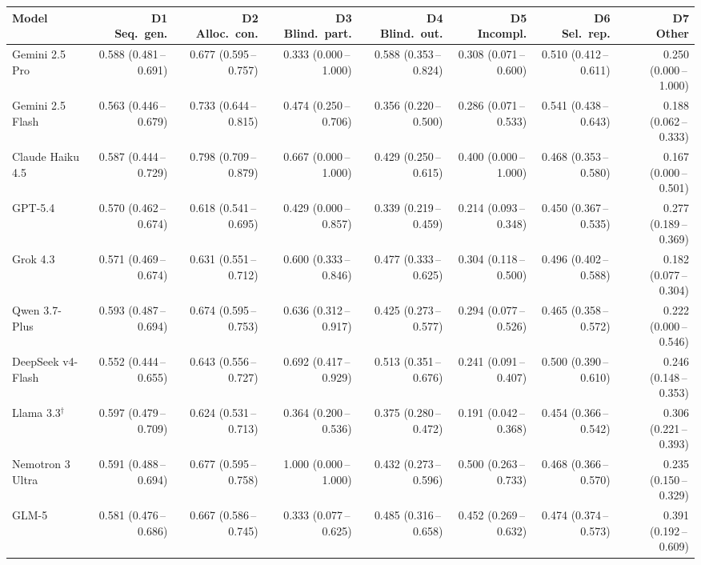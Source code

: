 \begin{tabular}{lrrrrrrr}
\toprule
Model & \makecell{D1\\Seq.\ gen.} & \makecell{D2\\Alloc.\ con.} & \makecell{D3\\Blind.\ part.} & \makecell{D4\\Blind.\ out.} & \makecell{D5\\Incompl.} & \makecell{D6\\Sel.\ rep.} & \makecell{D7\\Other} \\
\midrule
Gemini 2.5 Pro & 0.588 (0.481\,--\,0.691) & 0.677 (0.595\,--\,0.757) & 0.333 (0.000\,--\,1.000) & 0.588 (0.353\,--\,0.824) & 0.308 (0.071\,--\,0.600) & 0.510 (0.412\,--\,0.611) & 0.250 (0.000\,--\,1.000) \\
Gemini 2.5 Flash & 0.563 (0.446\,--\,0.679) & 0.733 (0.644\,--\,0.815) & 0.474 (0.250\,--\,0.706) & 0.356 (0.220\,--\,0.500) & 0.286 (0.071\,--\,0.533) & 0.541 (0.438\,--\,0.643) & 0.188 (0.062\,--\,0.333) \\
Claude Haiku 4.5 & 0.587 (0.444\,--\,0.729) & 0.798 (0.709\,--\,0.879) & 0.667 (0.000\,--\,1.000) & 0.429 (0.250\,--\,0.615) & 0.400 (0.000\,--\,1.000) & 0.468 (0.353\,--\,0.580) & 0.167 (0.000\,--\,0.501) \\
GPT-5.4 & 0.570 (0.462\,--\,0.674) & 0.618 (0.541\,--\,0.695) & 0.429 (0.000\,--\,0.857) & 0.339 (0.219\,--\,0.459) & 0.214 (0.093\,--\,0.348) & 0.450 (0.367\,--\,0.535) & 0.277 (0.189\,--\,0.369) \\
Grok 4.3 & 0.571 (0.469\,--\,0.674) & 0.631 (0.551\,--\,0.712) & 0.600 (0.333\,--\,0.846) & 0.477 (0.333\,--\,0.625) & 0.304 (0.118\,--\,0.500) & 0.496 (0.402\,--\,0.588) & 0.182 (0.077\,--\,0.304) \\
Qwen 3.7-Plus & 0.593 (0.487\,--\,0.694) & 0.674 (0.595\,--\,0.753) & 0.636 (0.312\,--\,0.917) & 0.425 (0.273\,--\,0.577) & 0.294 (0.077\,--\,0.526) & 0.465 (0.358\,--\,0.572) & 0.222 (0.000\,--\,0.546) \\
DeepSeek v4-Flash & 0.552 (0.444\,--\,0.655) & 0.643 (0.556\,--\,0.727) & 0.692 (0.417\,--\,0.929) & 0.513 (0.351\,--\,0.676) & 0.241 (0.091\,--\,0.407) & 0.500 (0.390\,--\,0.610) & 0.246 (0.148\,--\,0.353) \\
Llama 3.3$^\dagger$ & 0.597 (0.479\,--\,0.709) & 0.624 (0.531\,--\,0.713) & 0.364 (0.200\,--\,0.536) & 0.375 (0.280\,--\,0.472) & 0.191 (0.042\,--\,0.368) & 0.454 (0.366\,--\,0.542) & 0.306 (0.221\,--\,0.393) \\
Nemotron 3 Ultra & 0.591 (0.488\,--\,0.694) & 0.677 (0.595\,--\,0.758) & 1.000 (0.000\,--\,1.000) & 0.432 (0.273\,--\,0.596) & 0.500 (0.263\,--\,0.733) & 0.468 (0.366\,--\,0.570) & 0.235 (0.150\,--\,0.329) \\
GLM-5 & 0.581 (0.476\,--\,0.686) & 0.667 (0.586\,--\,0.745) & 0.333 (0.077\,--\,0.625) & 0.485 (0.316\,--\,0.658) & 0.452 (0.269\,--\,0.632) & 0.474 (0.374\,--\,0.573) & 0.391 (0.192\,--\,0.609) \\
\bottomrule
\end{tabular}